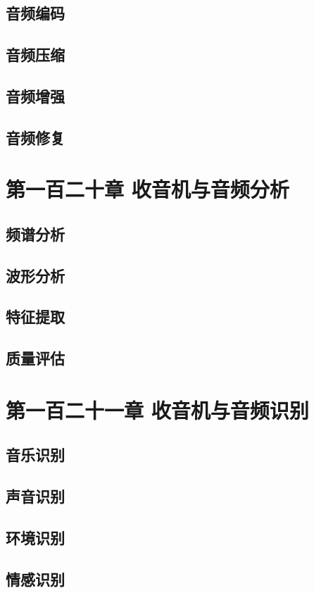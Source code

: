 \documentclass[12pt,UTF8]{ctexbook}
\begin{document}
\section{音频编码}
\section{音频压缩}
\section{音频增强}
\section{音频修复}

\chapter{第一百二十章 收音机与音频分析}

\section{频谱分析}
\section{波形分析}
\section{特征提取}
\section{质量评估}

\chapter{第一百二十一章 收音机与音频识别}

\section{音乐识别}
\section{声音识别}
\section{环境识别}
\section{情感识别}
\end{document}
